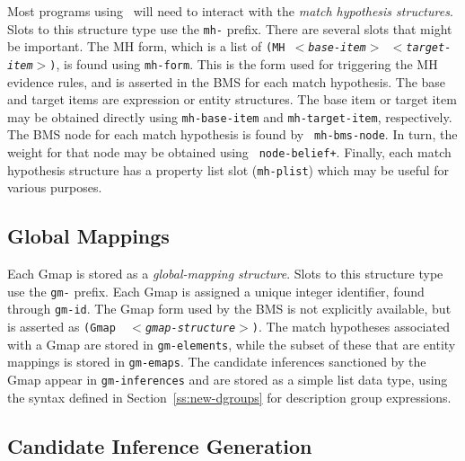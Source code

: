 Most programs using \SME\ will need to interact with the {\it match
hypothesis structures}. Slots to this structure type use the {\tt mh-}
prefix. There are several slots that might be important. The MH form, which
is a list of {\tt (MH {\it $<$base-item$>$} {\it $<$target-item$>$})}, is found
using {\tt mh-form}. This is the form used for triggering the MH evidence
rules, and is asserted in the BMS for each match hypothesis. The base and
target items are expression or entity structures. The base item or target item may
be obtained directly using {\tt mh-base-item} and {\tt mh-target-item},
respectively.  The BMS node for each match hypothesis is found by {\tt
mh-bms-node}. In turn, the weight for that node may be obtained using {\tt
node-belief+}.  Finally, each match hypothesis structure has a property list
slot ({\tt mh-plist}) which may be useful for various purposes.

\subsection{Global Mappings}


Each Gmap is stored as a {\it global-mapping structure}. Slots to this
structure type use the {\tt gm-} prefix. Each Gmap is assigned a unique
integer identifier, found through {\tt gm-id}. The Gmap form used by the BMS
is not explicitly available, but is asserted as {\tt (Gmap {\it
$<$gmap-structure$>$})}. The match hypotheses associated with a Gmap are stored
in {\tt gm-elements}, while the subset of these that are entity mappings is
stored in {\tt gm-emaps}. The candidate inferences sanctioned by the Gmap
appear in {\tt gm-inferences} and are stored as a simple list data type,
using the syntax defined in Section~\ref{ss:new-dgroups} for description
group expressions.

\subsection{Candidate Inference Generation}

